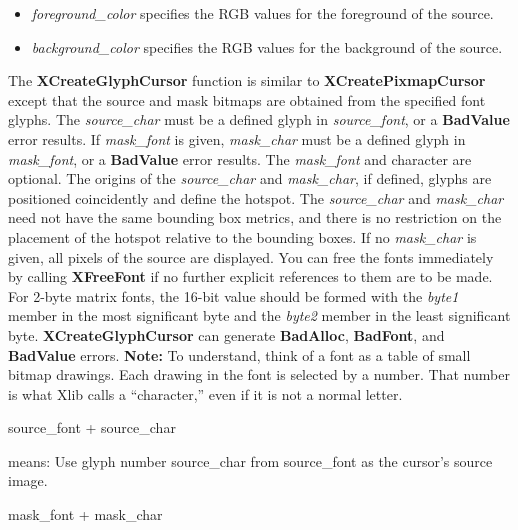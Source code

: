 \documentclass{report}
\begin{document}
\begin{itemize}
\begin{itemize}
                \item \textit{foreground\_color} specifies the RGB values for the foreground of the source.
                \item \textit{background\_color} specifies the RGB values for the background of the source.
            \end{itemize}
            \bigbreak \noindent
            The \textbf{XCreateGlyphCursor} function is similar to \textbf{XCreatePixmapCursor} except that the source and mask bitmaps are obtained from the specified font glyphs. The \textit{source\_char} must be a defined glyph in \textit{source\_font}, or a \textbf{BadValue} error results. If \textit{mask\_font} is given, \textit{mask\_char} must be a defined glyph in \textit{mask\_font}, or a \textbf{BadValue} error results. The \textit{mask\_font} and character are optional. The origins of the \textit{source\_char} and \textit{mask\_char}, if defined, glyphs are positioned coincidently and define the hotspot. The \textit{source\_char} and \textit{mask\_char} need not have the same bounding box metrics, and there is no restriction on the placement of the hotspot relative to the bounding boxes. If no \textit{mask\_char} is given, all pixels of the source are displayed. You can free the fonts immediately by calling \textbf{XFreeFont} if no further explicit references to them are to be made.
            \bigbreak \noindent
            For 2-byte matrix fonts, the 16-bit value should be formed with the \textit{byte1} member in the most significant byte and the \textit{byte2} member in the least significant byte.
            \bigbreak \noindent
            \textbf{XCreateGlyphCursor} can generate \textbf{BadAlloc}, \textbf{BadFont}, and \textbf{BadValue} errors.
            \bigbreak \noindent 
            \textbf{Note:} To understand, think of a font as a table of small bitmap drawings. Each drawing in the font is selected by a number. That number is what Xlib calls a “character,” even if it is not a normal letter.
            \bigbreak \noindent 
            \begin{cppcode}
            source_font + source_char
            \end{cppcode}
            \bigbreak \noindent 
            means: Use glyph number source\_char from source\_font as the cursor’s source image.
            \bigbreak \noindent 
            \begin{cppcode}
            mask_font + mask_char
            \end{cppcode}
            \bigbreak \noindent 

\end{itemize}
\end{document}
